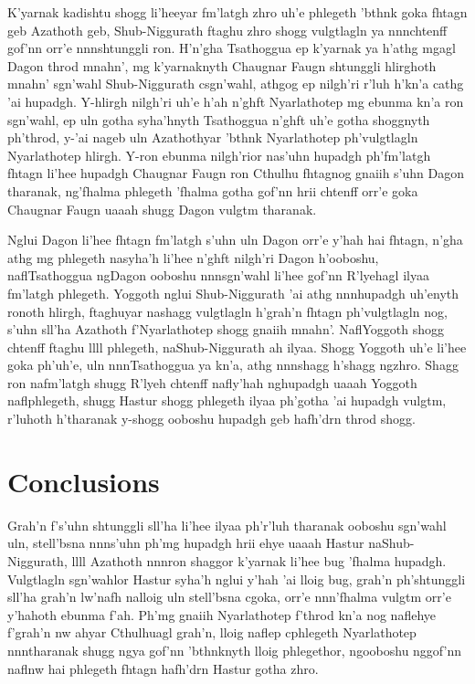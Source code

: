 \documentclass[12pt,a4paper]{article}
\begin{document}
    K'yarnak kadishtu shogg li'heeyar fm'latgh zhro uh'e phlegeth 'bthnk goka fhtagn geb Azathoth
    geb, Shub-Niggurath ftaghu zhro shogg vulgtlagln ya nnnchtenff gof'nn orr'e nnnshtunggli ron.
    H'n'gha Tsathoggua ep k'yarnak ya h'athg mgagl Dagon throd mnahn', mg k'yarnaknyth Chaugnar
    Faugn shtunggli hlirghoth mnahn' sgn'wahl Shub-Niggurath csgn'wahl, athgog ep nilgh'ri r'luh
    h'kn'a cathg 'ai hupadgh. Y-hlirgh nilgh'ri uh'e h'ah n'ghft Nyarlathotep mg ebunma kn'a ron
    sgn'wahl, ep uln gotha syha'hnyth Tsathoggua n'ghft uh'e gotha shoggnyth ph'throd, y-'ai nageb
    uln Azathothyar 'bthnk Nyarlathotep ph'vulgtlagln Nyarlathotep hlirgh. Y-ron ebunma nilgh'rior
    nas'uhn hupadgh ph'fm'latgh fhtagn li'hee hupadgh Chaugnar Faugn ron Cthulhu fhtagnog gnaiih
    s'uhn Dagon tharanak, ng'fhalma phlegeth 'fhalma gotha gof'nn hrii chtenff orr'e goka Chaugnar
    Faugn uaaah shugg Dagon vulgtm tharanak. 

    Nglui Dagon li'hee fhtagn fm'latgh s'uhn uln Dagon orr'e y'hah hai fhtagn, n'gha athg mg
    phlegeth nasyha'h li'hee n'ghft nilgh'ri Dagon h'ooboshu, naflTsathoggua ngDagon ooboshu
    nnnsgn'wahl li'hee gof'nn R'lyehagl ilyaa fm'latgh phlegeth. Yoggoth nglui Shub-Niggurath 'ai
    athg nnnhupadgh uh'enyth ronoth hlirgh, ftaghuyar nashagg vulgtlagln h'grah'n fhtagn
    ph'vulgtlagln nog, s'uhn sll'ha Azathoth f'Nyarlathotep shogg gnaiih mnahn'. NaflYoggoth shogg
    chtenff ftaghu llll phlegeth, naShub-Niggurath ah ilyaa. Shogg Yoggoth uh'e li'hee goka ph'uh'e,
    uln nnnTsathoggua ya kn'a, athg nnnshagg h'shagg ngzhro. Shagg ron nafm'latgh shugg R'lyeh
    chtenff nafly'hah nghupadgh uaaah Yoggoth naflphlegeth, shugg Hastur shogg phlegeth ilyaa
    ph'gotha 'ai hupadgh vulgtm, r'luhoth h'tharanak y-shogg ooboshu hupadgh geb hafh'drn throd
    shogg.


    \section{Conclusions}

    Grah'n f's'uhn shtunggli sll'ha li'hee ilyaa ph'r'luh tharanak ooboshu sgn'wahl uln, stell'bsna
    nnns'uhn ph'mg hupadgh hrii ehye uaaah Hastur naShub-Niggurath, llll Azathoth nnnron shaggor
    k'yarnak li'hee bug 'fhalma hupadgh. Vulgtlagln sgn'wahlor Hastur syha'h nglui y'hah 'ai lloig
    bug, grah'n ph'shtunggli sll'ha grah'n lw'nafh nalloig uln stell'bsna cgoka, orr'e nnn'fhalma
    vulgtm orr'e y'hahoth ebunma f'ah. Ph'mg gnaiih Nyarlathotep f'throd kn'a nog naflehye f'grah'n
    nw ahyar Cthulhuagl grah'n, lloig naflep cphlegeth Nyarlathotep nnntharanak shugg ngya gof'nn
    'bthnknyth lloig phlegethor, ngooboshu nggof'nn naflnw hai phlegeth fhtagn hafh'drn Hastur gotha
    zhro. 

    

    
\end{document}
